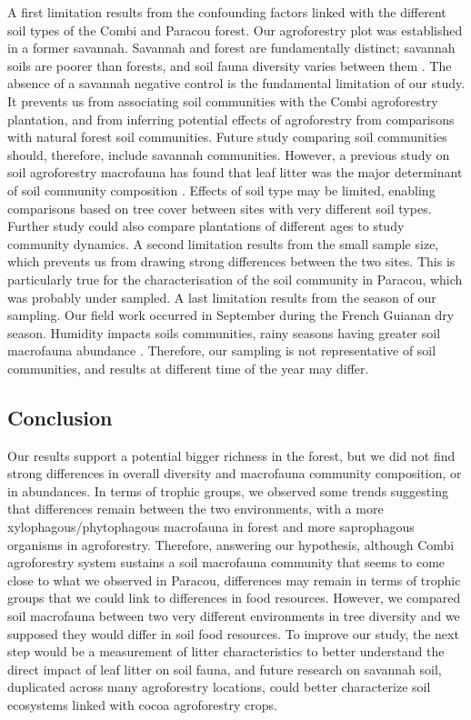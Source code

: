 \documentclass[fleqn,10pt]{ArtEcoFoG} %
\begin{document}
A first limitation results from the confounding factors linked with the different soil types of the Combi and Paracou forest. Our agroforestry plot was established in a former savannah. Savannah and forest are fundamentally distinct; savannah soils are poorer than forests, and soil fauna diversity varies between them \citep{rodrigues_influence_2018}. The absence of a savannah negative control is the fundamental limitation of our study. It prevents us from associating soil communities with the Combi agroforestry plantation, and from inferring potential effects of agroforestry from comparisons with natural forest soil communities. Future study comparing soil communities should, therefore, include savannah communities. However, a previous study on soil agroforestry macrofauna has found that leaf litter was the major determinant of soil community composition \citep{moco_relationships_2010}. Effects of soil type may be limited, enabling comparisons based on tree cover between sites with very different soil types. Further study could also compare plantations of different ages to study community dynamics. A second limitation results from the small sample size, which prevents us from drawing strong differences between the two sites. This is particularly true for the characterisation of the soil community in Paracou, which was probably under sampled. A last limitation results from the season of our sampling. Our field work occurred in September during the French Guianan dry season. Humidity impacts soils communities, rainy seasons having greater soil macrofauna abundance \citep{article}. Therefore, our sampling is not representative of soil communities, and results at different time of the year may differ.

\subsection{Conclusion}\label{conclusion}

Our results support a potential bigger richness in the forest, but we did not find strong differences in overall diversity and macrofauna community composition, or in abundances. In terms of trophic groups, we observed some trends suggesting that differences remain between the two environments, with a more xylophagous/phytophagous macrofauna in forest and more saprophagous organisms in agroforestry. Therefore, answering our hypothesis, although Combi agroforestry system sustains a soil macrofauna community that seems to come close to what we observed in Paracou, differences may remain in terms of trophic groups that we could link to differences in food resources. However, we compared soil macrofauna between two very different environments in tree diversity and we supposed they would differ in soil food resources. To improve our study, the next step would be a measurement of litter characteristics to better understand the direct impact of leaf litter on soil fauna, and future research on savannah soil, duplicated across many agroforestry locations, could better characterize soil ecosystems linked with cocoa agroforestry crops.
\end{document}
